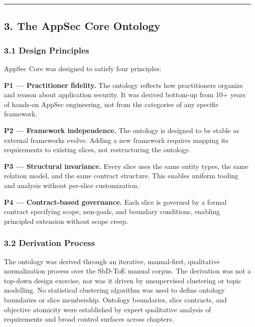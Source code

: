 \documentclass[
]{article}
\begin{document}
\begin{center}\rule{0.5\linewidth}{0.5pt}\end{center}

\subsection{3. The AppSec Core Ontology}\label{the-appsec-core-ontology}

\subsubsection{3.1 Design Principles}\label{design-principles}

AppSec Core was designed to satisfy four principles:

\textbf{P1 --- Practitioner fidelity.} The ontology reflects how
practitioners organize and reason about application security. It was
derived bottom-up from 10+ years of hands-on AppSec engineering, not
from the categories of any specific framework.

\textbf{P2 --- Framework independence.} The ontology is designed to be
stable as external frameworks evolve. Adding a new framework requires
mapping its requirements to existing slices, not restructuring the
ontology.

\textbf{P3 --- Structural invariance.} Every slice uses the same entity
types, the same relation model, and the same contract structure. This
enables uniform tooling and analysis without per-slice customization.

\textbf{P4 --- Contract-based governance.} Each slice is governed by a
formal contract specifying scope, non-goals, and boundary conditions,
enabling principled extension without scope creep.

\subsubsection{3.2 Derivation Process}\label{derivation-process}

The ontology was derived through an iterative, manual-first, qualitative
normalization process over the SbD-ToE manual corpus. The derivation was
not a top-down design exercise, nor was it driven by unsupervised
clustering or topic modelling. No statistical clustering algorithm was
used to define ontology boundaries or slice membership. Ontology
boundaries, slice contracts, and objective atomicity were established by
expert qualitative analysis of requirements and broad control surfaces
across chapters.
\end{document}
